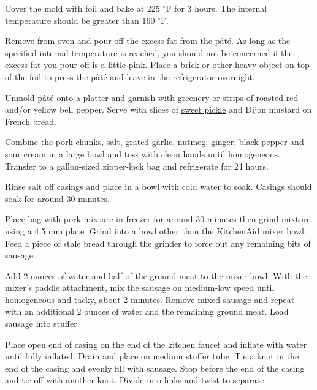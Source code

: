 \documentclass[letterpaper]{recipePMG}
\renewcommand{\deg}{$^\circ$}
\begin{document}
Cover the mold with foil and bake at 225 \deg F for 3 hours.  The internal temperature should be greater than 160 \deg F.

Remove from oven and pour off the excess fat from the p\^{a}t\'{e}.  As long as the specified internal temperature is reached, you should not be concerned if the excess fat you pour off is a little pink. Place a brick or
other heavy object on top of the foil to press the p\^{a}t\'{e} and leave
in the refrigerator overnight.

Unmold p\^{a}t\'{e} onto a platter
and garnish with greenery or strips of roasted red and/or yellow
bell pepper.  Serve with slices of \hyperref[SweetPickles]{sweet pickle} and Dijon mustard
on French bread.

\newpage
{}
\label{Bratwurst}


Combine the pork chunks, salt, grated garlic, nutmeg, ginger, black pepper and sour cream  in a large bowl and toss with clean hands until homogeneous. Transfer to a gallon-sized zipper-lock bag and refrigerate for 24 hours.

Rinse salt off casings and place in a bowl with cold water to soak.  Casings should soak for around 30 minutes.

Place bag with pork mixture in freezer for around 30 minutes then grind mixture using a 4.5 mm plate. Grind into a bowl other than the KitchenAid mixer bowl. Feed a piece of stale bread through the grinder to force out any remaining bits of sausage. 


Add 2 ounces of water and half of the ground meat to the mixer bowl. With the mixer's paddle attachment, mix the sausage on medium-low speed until homogeneous and tacky, about 2 minutes. Remove mixed sausage and repeat with an additional 2 ounces of water and the remaining ground meat. Load sausage into stuffer. 

Place open end of casing on the end of the kitchen faucet and inflate with water until fully inflated. Drain and place on medium stuffer tube. Tie a knot in the end of the casing and evenly fill with sausage. Stop before the end of the casing and tie off with another knot.  Divide into links and twist to separate. 
\end{document}
